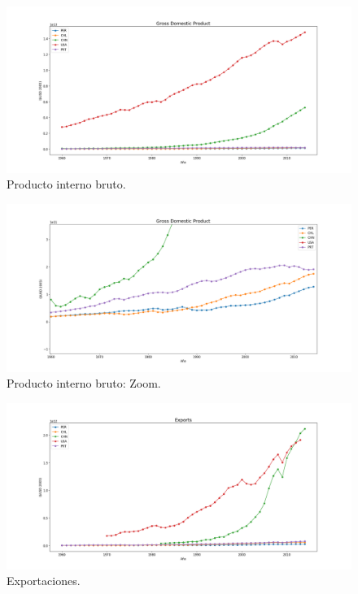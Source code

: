 \documentclass{article}
\begin{document}
\begin{figure}
	\centering
	\includegraphics[scale=0.38]{images/figure_1-4.png}
	\caption{Producto interno bruto.}
	\label{fig:6}
\end{figure}

\begin{figure}
	\centering
	\includegraphics[scale=0.38]{images/a.png}
	\caption{Producto interno bruto: Zoom.}
	\label{fig:7}
\end{figure}


\begin{figure}
	\centering
	\includegraphics[scale=0.38]{images/figure_1-5.png}
	\caption{Exportaciones.}
	\label{fig:8}
\end{figure}
\end{document}
